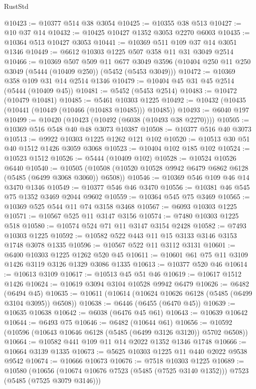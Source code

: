 \begin{lexlean}{RustStd}
\begin{coremodule}
@10423 := @10377 @514 @38 @3054
@10425 := @10355 @38 @513
@10427 := @10 @37 @14
@10432 := @10425 @10427 @1352 @3053 @2270 @6003
@10435 := @10364 @513 @10427 @3053
@10441 := @10369 @511 @109 @37 @14 @3051 @1346
@10449 := @6612 @10303 @1225 @507 @358 @11 @31 @3049 @2514
@10466 := @10369
    @507
    @509
    @11
    @677
    @3049
    @3596
    (@10404 @250 @11 @250 @3049 (@5444 (@10409 @250)) (@5452 (@5453 @3049)))
@10472 := @10369 @358 @109 @31 @14 @2514 @1346
@10479 := @10404 @45 @31 @45 @2514 (@5444 (@10409 @45))
@10481 := @5452 (@5453 @2514)
@10483 := @10472 (@10479 @10481)
@10485 := @5461 @10303 @1225
@10492 := @10432 (@10435 (@10441 (@10449 (@10466 (@10483 @10485))) @10485))
@10493 := @6040 @197
@10499 := @10420 (@10423 (@10492 (@6038 (@10493 @38 @2270))))
@10505 := @10369 @516 @548 @40 @48 @3073 @10387
@10508 := @10377 @516 @40 @3073
@10513 := @9922 @10303 @1225 @1262 @121 @102
@10520 := @10513 @30 @51 @40 @1512 @1426 @3059 @3068
@10523 := @10404 @102 @185 @102
@10524 := @10523 @1512
@10526 := @5444 (@10409 @102)
@10528 := @10524 @10526 @6440
@10540 := @10505 (@10508 (@10520 @10528 @9942 @6479 @6862 @6128 (@5485 (@6499 @3068 @3060)) @6508))
@10546 := @10369 @546 @109 @46 @14 @3470 @1346
@10549 := @10377 @546 @46 @3470
@10556 := @10381 @46 @545 @75 @1352 @3469 @2044 @9602
@10559 := @10364 @545 @75 @3469
@10565 := @10369 @525 @544 @11 @74 @3158 @3468
@10567 := @6093 @10303 @1225
@10571 := @10567 @525 @11 @3147 @3156
@10574 := @7480 @10303 @1225 @518
@10580 := @10574 @524 @71 @11 @3147 @3154 @2428
@10582 := @7493 @10303 @1225
@10592 := @10582 @522 @443 @11 @15 @3133 @3146 @3153 @1748 @3078 @1335
@10596 := @10567 @522 @11 @3112 @3131
@10601 := @6400 @10303 @1225 @1262 @520 @45
@10611 := @10601 @61 @75 @11 @3109 @1426 @3119 @3126 @1329 @3086 @1335
@10613 := @10377 @520 @46
@10614 := @10613 @3109
@10617 := @10513 @45 @51 @46
@10619 := @10617 @1512 @1426
@10624 := @10619 @3094 @3104 @10528 @9942 @6479
@10626 := @6482 (@6494 @45)
@10635 := @10611 (@10614 (@10624 @10626 @6128 (@5485 (@6499 @3104 @3095)) @6508))
@10638 := @6446 (@6455 (@6470 @45))
@10639 := @10635 @10638
@10642 := @6038 (@6476 @45 @61)
@10643 := @10639 @10642
@10644 := @6493 @75
@10646 := @6482 (@10644 @61)
@10656 := @10592 (@10596 (@10643 @10646 @6128 (@5485 (@6499 @3126 @3120)) @5702 @6508))
@10664 := @10582 @441 @109 @11 @14 @2022 @1352 @1346 @1748
@10666 := @10664 @3139 @1335
@10673 := @5625 @10303 @1225 @11 @440 @2022 @9538 @9542
@10674 := @10666 @10673
@10676 := @7518 @10303 @1225
@10689 := @10580
    (@10656 (@10674 @10676 @7523 (@5485 (@7525 @3140 @1352))) @7523 (@5485 (@7525 @3079 @3146)))

\end{coremodule}
\end{lexlean}
